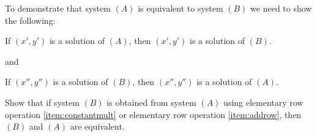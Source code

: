 \documentclass{ximera}
\begin{document}
\begin{problem}
To demonstrate that system $(A)$ is equivalent to system $(B)$ we need to show the following:
\begin{center}
If $(x', y')$ is a solution of $(A)$, then $(x', y')$ is a solution of $(B)$.

and

If $(x'', y'')$ is a solution of $(B)$, then $(x'', y'')$ is a solution of $(A)$.
\end{center}

Show that  if system $(B)$ is obtained from system $(A)$ using elementary row operation \ref{item:constantmult} or elementary row operation \ref{item:addrow}, then $(B)$ and $(A)$ are equivalent.
\end{problem}
\end{document}
